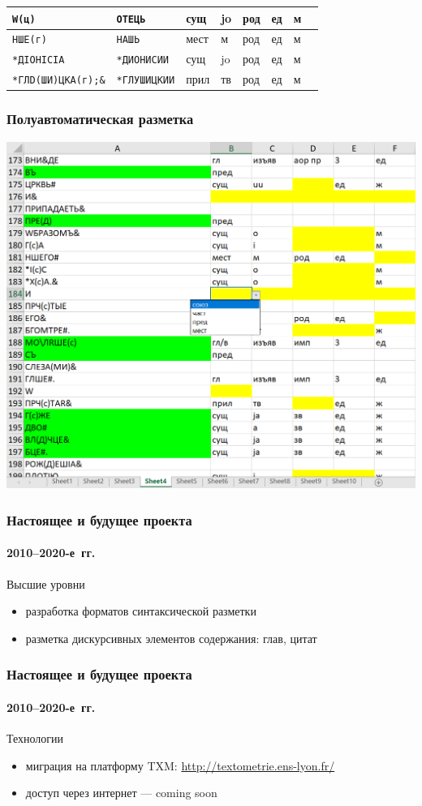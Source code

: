 \documentclass[xetex, aspectratio=169, russian]{beamer}
\begin{document}
\begin{frame}
\begin{tabularx}{\textwidth}{XXp{0.75cm}p{0.75cm}p{0.75cm}p{0.75cm}p{0.75cm}p{0.75cm}}
    \texttt{W(ц)} & \texttt{ОТЕЦЬ}                   & сущ  & jo & род & ед & м  &    \\ \midrule
    \texttt{НШЕ(г)} & \texttt{НАШЬ}                  & мест & м  & род & ед & м  &    \\ \midrule
    \texttt{*ДIОНIСIА} & \texttt{*ДИОНИСИИ}          & сущ  & jo & род & ед & м  &    \\ \midrule
    \texttt{*ГЛD(ШИ)ЦКА(г);\&} & \texttt{*ГЛУШИЦКИИ} & прил & тв & род & ед & м  &    \\ \bottomrule
  \end{tabularx}
\end{frame}

\begin{frame}
  \frametitle{Полуавтоматическая разметка}

  \begin{center}
    \includegraphics[width=0.6\linewidth]{precedent}
  \end{center}
\end{frame}

\begin{frame}
  \frametitle{Настоящее и будущее проекта}
  \framesubtitle{2010--2020-е~гг.}

  \begin{block}{Высшие уровни}
    \begin{itemize}
      \item разработка форматов синтаксической разметки\autocite{gorlov:2018}
      \item разметка дискурсивных элементов содержания: глав\autocite{rogozina:2015}, цитат\autocite{alexeeva:2019}
    \end{itemize}
  \end{block}
\end{frame}

\begin{frame}
  \frametitle{Настоящее и будущее проекта}
  \framesubtitle{2010--2020-е~гг.}

  \begin{block}{Технологии}
    \begin{itemize}
      \item миграция на платформу TXM: \url{http://textometrie.ens-lyon.fr/}
      \item доступ через интернет --- \foreignlanguage{english}{coming soon}
    \end{itemize}
  \end{block}
\end{frame}
\end{document}
